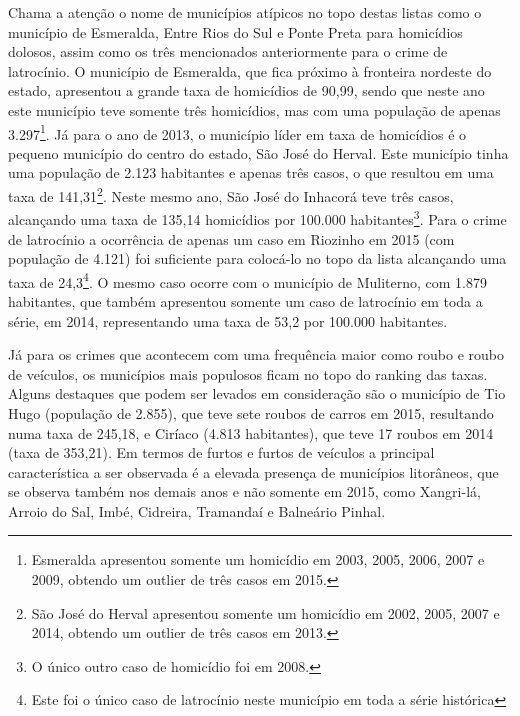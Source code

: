 \documentclass[12pt,openright,oneside,a4paper,english,french,spanish]{abntex2}
\numberwithin{table}{section} %
\numberwithin{figure}{section} %
\begin{document}
Chama a atenção o nome de municípios atípicos no topo destas listas como o município de Esmeralda, Entre Rios do Sul e Ponte Preta para homicídios dolosos, assim como os três mencionados anteriormente para o crime de latrocínio. O município de Esmeralda, que fica próximo à fronteira nordeste do estado, apresentou a grande taxa de homicídios de 90,99, sendo que neste ano este município teve somente três homicídios, mas com uma população de apenas 3.297\footnote{Esmeralda apresentou somente um homicídio em 2003, 2005, 2006, 2007 e 2009, obtendo um outlier de três casos em 2015.}. Já para o ano de 2013, o município líder em taxa de homicídios é o pequeno município do centro do estado, São José do Herval. Este município tinha uma população de 2.123 habitantes e apenas três casos, o que resultou em uma taxa de 141,31\footnote{São José do Herval apresentou somente um homicídio em 2002, 2005, 2007 e 2014, obtendo um outlier de três casos em 2013.}. Neste mesmo ano, São José do Inhacorá teve três casos, alcançando uma taxa de 135,14 homicídios por 100.000 habitantes\footnote{O único outro caso de homicídio foi em 2008.}. Para o crime de latrocínio a ocorrência de apenas um caso em Riozinho em 2015 (com população de 4.121) foi suficiente para colocá-lo no topo da lista alcançando uma taxa de 24,3\footnote{Este foi o único caso de latrocínio neste município em toda a série histórica}. O mesmo caso ocorre com o município de Muliterno, com 1.879 habitantes, que também apresentou somente um caso de latrocínio em toda a série, em 2014, representando uma taxa de 53,2 por 100.000 habitantes. 

Já para os crimes que acontecem com uma frequência maior como roubo e roubo de veículos, os municípios mais populosos ficam no topo do ranking das taxas. Alguns destaques que podem ser levados em consideração são o município de Tio Hugo (população de 2.855), que teve sete roubos de carros em 2015, resultando numa taxa de 245,18, e Ciríaco (4.813 habitantes), que teve 17 roubos em 2014 (taxa de 353,21). Em termos de furtos e furtos de veículos a principal característica a ser observada é a elevada presença de municípios litorâneos, que se observa também nos demais anos e não somente em 2015, como Xangri-lá, Arroio do Sal, Imbé, Cidreira, Tramandaí e Balneário Pinhal. 
\end{document}
